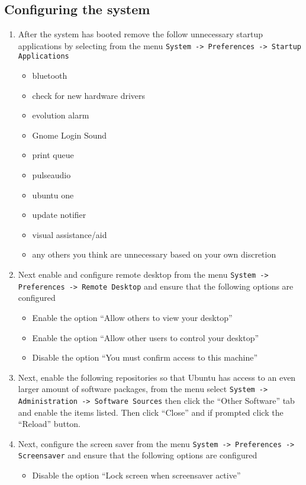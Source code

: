 \newpage
\subsection{Configuring the system}
\label{sec:ubuntuconfig}
\begin{enumerate}
\item	After the system has booted remove the follow unnecessary startup applications by selecting from the menu  
		\verb|System -> Preferences -> Startup Applications|
\begin{itemize}
\item	bluetooth
\item	check for new hardware drivers
\item	evolution alarm
\item	Gnome Login Sound
\item	print queue
\item	pulseaudio
\item	ubuntu one
\item	update notifier
\item	visual assistance/aid
\item	any others you think are unnecessary based on your own discretion
\end{itemize}

\item Next enable and configure remote desktop from the menu \verb|System -> Preferences -> Remote Desktop| and ensure
that the following options are configured
\begin{itemize}
\item	Enable the option ``Allow others to view your desktop''
\item	Enable the option ``Allow other users to control your desktop''
\item	Disable the option ``You must confirm access to this machine''
\end{itemize}

\item 	Next, enable the following repositories so that Ubuntu has access to an even larger amount of software packages, from the
		menu select \verb|System -> Administration -> Software Sources| then click the ``Other Software'' tab and enable the items
		listed. Then click ``Close'' and if prompted click the ``Reload'' button. 

\item 	Next, configure the screen saver from the menu \verb|System -> Preferences -> Screensaver| and ensure that the following options
		are configured
\begin{itemize}
\item	Disable the option ``Lock screen when screensaver active''
\end{itemize}


\end{enumerate}
